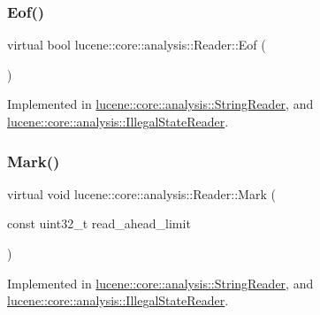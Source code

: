 \mbox{\label{classlucene_1_1core_1_1analysis_1_1Reader_af7a24f3904f9c40e9c5c204b3434f1f7}} 
\subsubsection{\texorpdfstring{Eof()}{Eof()}}
{\footnotesize\ttfamily virtual bool lucene\+::core\+::analysis\+::\+Reader\+::\+Eof (\begin{DoxyParamCaption}{ }\end{DoxyParamCaption})\hspace{0.3cm}{\ttfamily [pure virtual]}}



Implemented in \mbox{\hyperlink{classlucene_1_1core_1_1analysis_1_1StringReader_a7697e462ff19e3e8fa135e38fa3e4999}{lucene\+::core\+::analysis\+::\+String\+Reader}}, and \mbox{\hyperlink{classlucene_1_1core_1_1analysis_1_1IllegalStateReader_a0f3665a702d4b01dc3298e547379339a}{lucene\+::core\+::analysis\+::\+Illegal\+State\+Reader}}.

\mbox{\label{classlucene_1_1core_1_1analysis_1_1Reader_a0b60b07a3f65098a50f10f6618097527}} 
\subsubsection{\texorpdfstring{Mark()}{Mark()}}
{\footnotesize\ttfamily virtual void lucene\+::core\+::analysis\+::\+Reader\+::\+Mark (\begin{DoxyParamCaption}\item[{const uint32\+\_\+t}]{read\+\_\+ahead\+\_\+limit }\end{DoxyParamCaption})\hspace{0.3cm}{\ttfamily [pure virtual]}}



Implemented in \mbox{\hyperlink{classlucene_1_1core_1_1analysis_1_1StringReader_a0ba42881881e4790dae54bc1c01063f5}{lucene\+::core\+::analysis\+::\+String\+Reader}}, and \mbox{\hyperlink{classlucene_1_1core_1_1analysis_1_1IllegalStateReader_a96a8cb65743ac1a4db9633b2e0d203fb}{lucene\+::core\+::analysis\+::\+Illegal\+State\+Reader}}.

